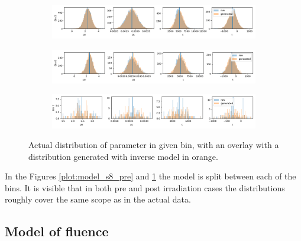 \begin{figure}[H]
\begin{subfigure}[b]{0.85\textwidth}
  \end{subfigure}
\begin{subfigure}[b]{0.85\textwidth}
    \centering
    \includegraphics[width=\linewidth]{figures/chapter4/surrogates/p3_histos_post_5.png}
  \end{subfigure}
\begin{subfigure}[b]{0.85\textwidth}
    \centering
    \includegraphics[width=\linewidth]{figures/chapter4/surrogates/p3_histos_post_6.png}
  \end{subfigure}
\begin{subfigure}[b]{0.85\textwidth}
    \centering
    \includegraphics[width=\linewidth]{figures/chapter4/surrogates/p3_histos_post_7.png}
  \end{subfigure}

    \label{plot:model_s8_post}
  \caption[model post ir]{Actual distribution of parameter in given bin, with an overlay with a distribution generated with inverse model in orange.}
\end{figure}

In the Figures \ref{plot:model_s8_pre} and \ref{plot:model_s8_post} the model is split between each of the bins.
It is visible that in both pre and post irradiation cases the distributions roughly cover the same scope as in the actual data.

\subsection{Model of fluence}

